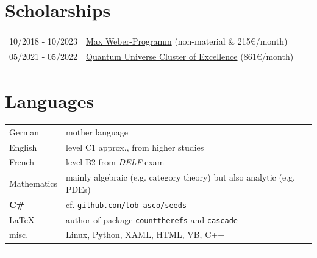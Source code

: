 \documentclass[english,10pt]{article}
\begin{document}
	\section*{Scholarships}
	\begin{tabularx}{\linewidth}{m{3cm}|X}
		10/2018 - 10/2023 & \href{https://www.elitenetzwerk.bayern.de/start/foerderangebote/max-weber-programm}{Max Weber-Programm} \hfill (non-material \& 215€/month)\\
		05/2021 - 05/2022 & \href{https://www.qu.uni-hamburg.de/}{Quantum Universe Cluster of Excellence} \hfill (861€/month)
	\end{tabularx}
	
	\section*{Languages}
	\begin{tabular}{m{3cm} | l}
		German & mother language\\
	English & level C1 approx., from higher studies\\
	French & level B2 from \textit{DELF}-exam\\
	Mathematics & mainly algebraic (e.g. category theory) but also analytic (e.g. PDEs)\\
	\textbf{C\#} & cf. \href{https://github.com/tob-asco/seeds}{\texttt{github.com/tob-asco/seeds}}\\
        \LaTeX & author of package \href{https://github.com/tob-asco/counttherefs.git}{\texttt{counttherefs}} and \href{https://github.com/tob-asco/cascade.git}{\texttt{cascade}}\\
	misc. & Linux, Python, XAML, HTML, VB, C++
	\end{tabular}
    \vfill
	\hrule
\end{document}
